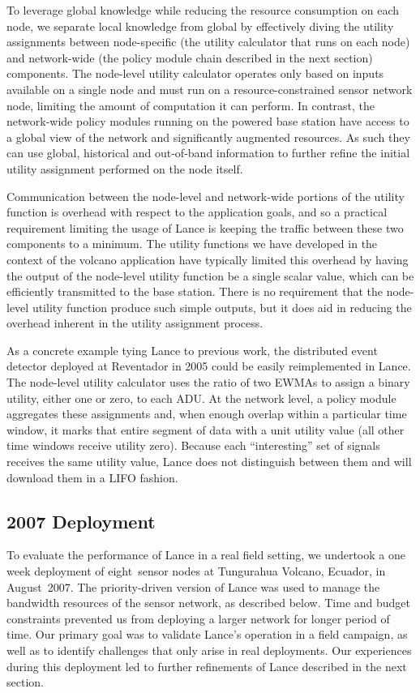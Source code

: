 To leverage global knowledge while reducing the resource consumption on each
node, we separate local knowledge from global by effectively diving the
utility assignments between node-specific (the utility calculator that runs
on each node) and network-wide (the policy module chain described in the next
section) components.  The node-level utility calculator operates only based
on inputs available on a single node and must run on a resource-constrained
sensor network node, limiting the amount of computation it can perform.  In
contrast, the network-wide policy modules running on the powered base station
have access to a global view of the network and significantly augmented
resources. As such they can use global, historical and out-of-band
information to further refine the initial utility assignment performed on the
node itself.

Communication between the node-level and network-wide portions of the utility
function is overhead with respect to the application goals, and so a
practical requirement limiting the usage of Lance is keeping the traffic
between these two components to a minimum. The utility functions we have
developed in the context of the volcano application have typically limited
this overhead by having the output of the node-level utility function be a
single scalar value, which can be efficiently transmitted to the base
station.  There is no requirement that the node-level utility function
produce such simple outputs, but it does aid in reducing the overhead
inherent in the utility assignment process.

As a concrete example tying Lance to previous work, the distributed event
detector deployed at Reventador in 2005 could be easily reimplemented in
Lance. The node-level utility calculator uses the ratio of two EWMAs to
assign a binary utility, either one or zero, to each ADU. At the network
level, a policy module aggregates these assignments and, when enough overlap
within a particular time window, it marks that entire segment of data with a
unit utility value (all other time windows receive utility zero). Because
each ``interesting'' set of signals receives the same utility value, Lance
does not distinguish between them and will download them in a LIFO fashion.

\subsection{2007 Deployment}

To evaluate the performance of Lance in a real field setting, we undertook a
one week deployment of eight~sensor nodes at Tungurahua Volcano, Ecuador, in
August~2007. The priority-driven version of Lance was used to manage the
bandwidth resources of the sensor network, as described below. Time and
budget constraints prevented us from deploying a larger network for longer
period of time. Our primary goal was to validate Lance's operation in a field
campaign, as well as to identify challenges that only arise in real
deployments. Our experiences during this deployment led to further
refinements of Lance described in the next section.

